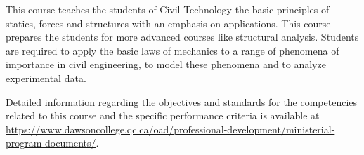 {This course teaches the students of Civil Technology the basic principles of statics, forces and structures with an emphasis on applications.  This course prepares the students for more advanced courses like structural analysis.  Students are required to apply the basic laws of mechanics to a range of phenomena of importance in civil engineering, to model these phenomena and to analyze experimental data.
\smallskip

Detailed information regarding the objectives and standards for the competencies related to this course and the specific performance criteria is available at \url{https://www.dawsoncollege.qc.ca/oad/professional-development/ministerial-program-documents/}.}

